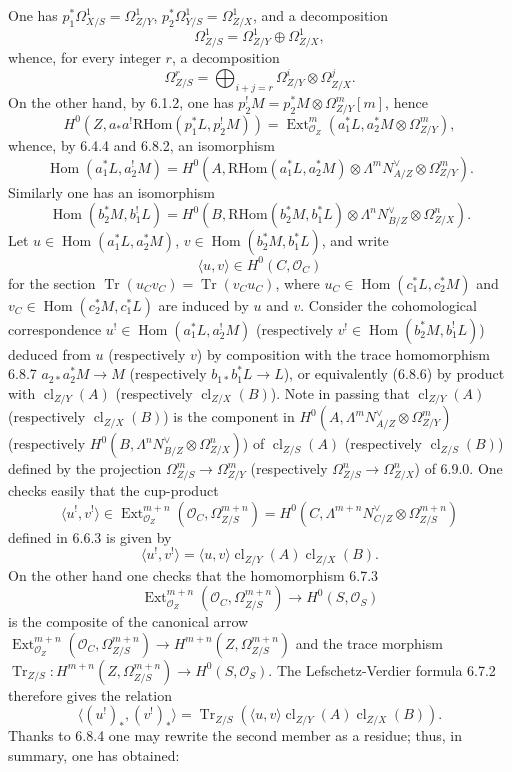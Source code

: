 \documentclass[11pt]{article}
\DeclareMathOperator{\Hom}{Hom}
\DeclareMathOperator{\Ext}{Ext}
\providecommand{\RHom}{\mathrm{RHom}}
\providecommand{\cl}{\operatorname{cl}}
\providecommand{\OO}{\mathcal{O}}
\providecommand{\RHom}{\mathrm{RHom}}
\providecommand{\Hom}{\operatorname{Hom}}
\providecommand{\RHom}{\mathrm R\mathcal{H}om}
\providecommand{\cl}{\operatorname{cl}}
\providecommand{\RHom}{\mathrm{RHom}}
\begin{document}
One has $p_1^*\Omega^1_{X/S}=\Omega^1_{Z/Y}$, $p_2^*\Omega^1_{Y/S}=\Omega^1_{Z/X}$, and a decomposition
\[
\Omega^1_{Z/S}=\Omega^1_{Z/Y}\oplus\Omega^1_{Z/X},
\]
whence, for every integer $r$, a decomposition
\begin{equation}
\tag{6.9.0}
\Omega^r_{Z/S}=\bigoplus_{i+j=r}\Omega^i_{Z/Y}\otimes\Omega^j_{Z/X}.
\end{equation}
On the other hand, by 6.1.2, one has $p_2^!M=p_2^*M\otimes\Omega^m_{Z/Y}[m]$, hence
\[
H^0(Z,a_*a^!\RHom(p_1^*L,p_2^!M))=\Ext^m_{\OO_Z}(a_1^*L,a_2^*M\otimes\Omega^m_{Z/Y}),
\]
whence, by 6.4.4 and 6.8.2, an isomorphism
\begin{equation}
\tag{6.9.1}
\Hom(a_1^*L,a_2^!M)=H^0(A,\RHom(a_1^*L,a_2^*M)\otimes\Lambda^m N_{A/Z}^{\vee}\otimes\Omega^m_{Z/Y}).
\end{equation}
Similarly one has an isomorphism
\begin{equation}
\tag{6.9.2}
\Hom(b_2^*M,b_1^!L)=H^0(B,\RHom(b_2^*M,b_1^*L)\otimes\Lambda^n N_{B/Z}^{\vee}\otimes\Omega^n_{Z/X}).
\end{equation}
Let $u\in\Hom(a_1^*L,a_2^*M)$, $v\in\Hom(b_2^*M,b_1^*L)$, and write
\begin{equation}
\tag{6.9.3}
\langle u,v\rangle\in H^0(C,\OO_C)
\end{equation}
for the section $\operatorname{Tr}(u_Cv_C)=\operatorname{Tr}(v_Cu_C)$, where $u_C\in\Hom(c_1^*L,c_2^*M)$ and $v_C\in\Hom(c_2^*M,c_1^*L)$ are induced by $u$ and $v$. Consider the cohomological correspondence $u^!\in\Hom(a_1^*L,a_2^!M)$ (respectively $v^!\in\Hom(b_2^*M,b_1^!L)$) deduced from $u$ (respectively $v$) by composition with the trace homomorphism 6.8.7 $a_{2*}a_2^*M\to M$ (respectively $b_{1*}b_1^*L\to L$), or equivalently (6.8.6) by product with $\cl_{Z/Y}(A)$ (respectively $\cl_{Z/X}(B)$). Note in passing that $\cl_{Z/Y}(A)$ (respectively $\cl_{Z/X}(B)$) is the component in $H^0(A,\Lambda^mN_{A/Z}^{\vee}\otimes\Omega^m_{Z/Y})$ (respectively $H^0(B,\Lambda^nN_{B/Z}^{\vee}\otimes\Omega^n_{Z/X})$) of $\cl_{Z/S}(A)$ (respectively $\cl_{Z/S}(B)$) defined by the projection $\Omega^m_{Z/S}\to\Omega^m_{Z/Y}$ (respectively $\Omega^n_{Z/S}\to\Omega^n_{Z/X}$) of 6.9.0. One checks easily that the cup-product
\[
\langle u^!,v^!\rangle\in\Ext^{m+n}_{\OO_Z}(\OO_C,\Omega^{m+n}_{Z/S})=H^0(C,\Lambda^{m+n}N_{C/Z}^{\vee}\otimes\Omega^{m+n}_{Z/S})
\]
defined in 6.6.3 is given by
\begin{equation}
\tag{6.9.4}
\langle u^!,v^!\rangle=\langle u,v\rangle\cl_{Z/Y}(A)\cl_{Z/X}(B).
\end{equation}
On the other hand one checks that the homomorphism 6.7.3
\[
\Ext^{m+n}_{\OO_Z}(\OO_C,\Omega^{m+n}_{Z/S})\longrightarrow H^0(S,\OO_S)
\]
is the composite of the canonical arrow $\Ext^{m+n}_{\OO_Z}(\OO_C,\Omega^{m+n}_{Z/S})\to H^{m+n}(Z,\Omega^{m+n}_{Z/S})$ and the trace morphism $\operatorname{Tr}_{Z/S}:H^{m+n}(Z,\Omega^{m+n}_{Z/S})\to H^0(S,\OO_S)$. The Lefschetz-Verdier formula 6.7.2 therefore gives the relation
\begin{equation}
\tag{6.9.5}
\langle (u^!)_*,(v^!)_*\rangle=\operatorname{Tr}_{Z/S}(\langle u,v\rangle\cl_{Z/Y}(A)\cl_{Z/X}(B)).
\end{equation}
Thanks to 6.8.4 one may rewrite the second member as a residue; thus, in summary, one has obtained:
\end{document}
